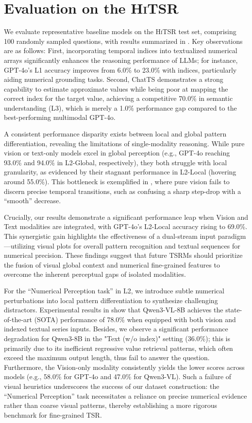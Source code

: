 \documentclass[11pt]{article}
\begin{document}
\section{Evaluation on the \textsc{HiTSR}}\label{sec:eval_hits}
We evaluate representative baseline models on the \textsc{HiTSR} test set, comprising 100 randomly sampled questions, with results summarized in . Key observations are as follows: First, incorporating temporal indices into textualized numerical arrays significantly enhances the reasoning performance of LLMs; for instance, GPT-4o’s L1 accuracy improves from 6.0\% to 23.0\% with indices, particularly aiding numerical grounding tasks. Second, ChatTS demonstrates a strong capability to estimate approximate values while being poor at mapping the correct index for the target value, achieving a competitive 70.0\% in semantic understanding (L3), which is merely a 1.0\% performance gap compared to the best-performing multimodal GPT-4o.

A consistent performance disparity exists between local and global pattern differentiation, revealing the limitations of single-modality reasoning. While pure vision or text-only models excel in global perception (e.g., GPT-4o reaching 93.0\% and 94.0\% in L2-Global, respectively), they both struggle with local granularity, as evidenced by their stagnant performance in L2-Local (hovering around 55.0\%). This bottleneck is exemplified in , where pure vision fails to discern precise temporal transitions, such as confusing a sharp step-drop with a ``smooth'' decrease.

Crucially, our results demonstrate a significant performance leap when Vision and Text modalities are integrated, with GPT-4o’s L2-Local accuracy rising to 69.0\%. This synergistic gain highlights the effectiveness of a dual-stream input paradigm—utilizing visual plots for overall pattern recognition and textual sequences for numerical precision. These findings suggest that future TSRMs should prioritize the fusion of visual global context and numerical fine-grained features to overcome the inherent perceptual gaps of isolated modalities.

For the ``Numerical Perception task'' in L2, we introduce subtle numerical perturbations into local pattern differentiation to synthesize challenging distractors. Experimental results in  show that Qwen3-VL-8B achieves the state-of-the-art (SOTA) performance of 78.0\% when equipped with both vision and indexed textual series inputs. Besides, we observe a significant performance degradation for Qwen3-8B in the "Text (w/o index)" setting (36.0\%); this is primarily due to its inefficient regressive value retrieval patterns, which often exceed the maximum output length, thus fail to answer the question. Furthermore, the Vision-only modality consistently yields the lower scores across models (e.g., 58.0\% for GPT-4o and 47.0\% for Qwen3-VL). Such a failure of visual heuristics underscores the success of our dataset construction: the ``Numerical Perception'' task necessitates a reliance on precise numerical evidence rather than coarse visual patterns, thereby establishing a more rigorous benchmark for fine-grained TSR.
\end{document}
